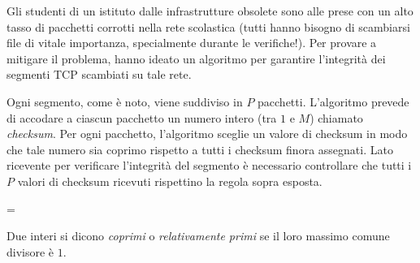\usepackage{xcolor}
\usepackage{afterpage}
\usepackage{pifont,mdframed}
\usepackage[bottom]{footmisc}



\newcommand{\inputfile}{\texttt{input.txt}}
\newcommand{\outputfile}{\texttt{output.txt}}

\newenvironment{warning}
  {\par\begin{mdframed}[linewidth=2pt,linecolor=gray]%
    \begin{list}{}{\leftmargin=1cm
                   \labelwidth=\leftmargin}\item[\Large\ding{43}]}
  {\end{list}\end{mdframed}\par}

\newcommand{\funcitem}[2]{\item[$\blacksquare$] \textbf{\large \textsf{Funzione} \texttt{#1}} \vspace{-0.3cm} \begin{center}\begin{tabularx}{\textwidth}{|c|X|} \hline #2 \hline \end{tabularx}\end{center}}



    Gli studenti di un istituto dalle infrastrutture obsolete sono alle prese con un alto tasso di pacchetti corrotti nella rete scolastica (tutti hanno bisogno di scambiarsi file di vitale importanza, specialmente durante le verifiche!). Per provare a mitigare il problema, hanno ideato un algoritmo per garantire l'integrità dei segmenti TCP scambiati su tale rete.

	Ogni segmento, come è noto, viene suddiviso in $P$ pacchetti. L'algoritmo prevede di accodare a ciascun pacchetto un numero intero (tra $1$ e $M$) chiamato \emph{checksum}. Per ogni pacchetto, l'algoritmo sceglie un valore di checksum in modo che tale numero sia coprimo rispetto a tutti i checksum finora assegnati. Lato ricevente per verificare l'integrità del segmento è necessario controllare che tutti i $P$ valori di checksum ricevuti rispettino la regola sopra esposta.

        \begin{warning}
            Due interi si dicono \emph{coprimi} o \emph{relativamente primi} se il loro massimo comune divisore è $1$.
        \end{warning}

